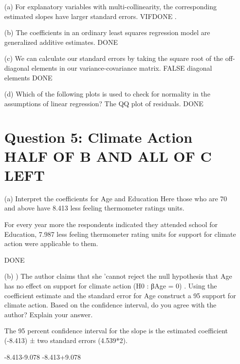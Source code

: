 \documentclass[12pt,letterpaper]{article}
\begin{document}
{\begin{enumerate}
\begin{verbatim}
	\end{verbatim}
\newpage
\section*{Question 4:Multiple Choice DONE}
\item [(a)] For explanatory variables with multi-collinearity, the corresponding estimated slopes have
larger standard errors.
VIFDONE .

\item [(b)] The coefficients in an ordinary least squares regression model are generalized additive estimates.
DONE 

\item [(c)] We can calculate our standard errors by taking the square root of the off-diagonal elements
in our variance-covariance matrix.
FALSE
 diagonal elements DONE

\item [(d)] Which of the following plots is used to check for normality in the assumptions of linear
regression?
The QQ plot of residuals.
DONE
 
	\vspace{.5cm}
	\newpage
\section*{Question 5: Climate Action HALF OF B AND ALL OF C LEFT}
\item [(a)]  Interpret the coefficients for Age and Education
Here those who are 70 and above have 8.413 less feeling thermometer ratings units. 

For every year more the respondents indicated they attended school for Education, 7.987 less feeling thermometer rating units for support for climate action were applicable to them. 

DONE

\item [(b)] ) The author claims that she ’cannot reject the null hypothesis that Age has no effect
on support for climate action (H0 : βAge = 0) . Using the coefficient estimate and the
standard error for Age construct a 95%
support for climate action. Based on the confidence interval, do you agree with the
author? Explain your answer.


	The 95
	percent confidence interval for the slope is the estimated coefficient (-8.413) ± two standard errors (4.539*2).
	
	-8.413-9.078
	-8.413+9.078
	

\end{enumerate}}
\end{document}
